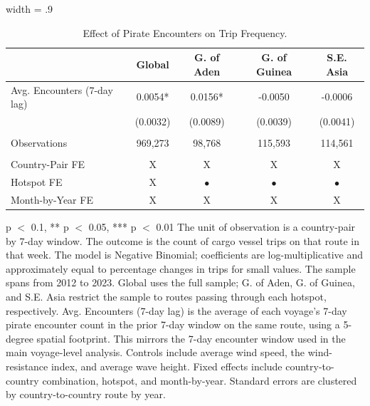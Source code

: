\begin{table}

\caption{Effect of Pirate Encounters on Trip Frequency. \label{tab:trip-count-rev1}}
\centering
\begin{adjustbox}{width = .9\textwidth}
\begin{threeparttable}
\begin{tabular}[t]{lcccc}
\toprule
  & Global & G. of Aden & G. of Guinea & S.E. Asia\\
\midrule
Avg. Encounters (7-day lag) & 0.0054* & 0.0156* & -0.0050 & -0.0006\\
 & (0.0032) & (0.0089) & (0.0039) & (0.0041)\\
 &  &  &  & \\
Observations & 969,273 & 98,768 & 115,593 & 114,561\\
 &  &  &  & \\
Country-Pair FE & X & X & X & X\\
Hotspot FE & X & $\bullet$ & $\bullet$ & $\bullet$\\
Month-by-Year FE & X & X & X & X\\
\bottomrule
\end{tabular}
\begin{tablenotes}
\item \scriptsize * p $<$ 0.1, ** p $<$ 0.05, *** p $<$ 0.01 The unit of observation is a country-pair by 7-day window. The outcome is the count of cargo vessel trips on that route in that week. The model is Negative Binomial; coefficients are log-multiplicative and approximately equal to percentage changes in trips for small values. The sample spans from 2012 to 2023. Global uses the full sample; G. of Aden, G. of Guinea, and S.E. Asia restrict the sample to routes passing through each hotspot, respectively. Avg. Encounters (7-day lag) is the average of each voyage's 7-day pirate encounter count in the prior 7-day window on the same route, using a 5-degree spatial footprint. This mirrors the 7-day encounter window used in the main voyage-level analysis. Controls include average wind speed, the wind-resistance index, and average wave height. Fixed effects include country-to-country combination, hotspot, and month-by-year. Standard errors are clustered by country-to-country route by year.
\end{tablenotes}
\end{threeparttable}
\end{adjustbox}
\end{table}
